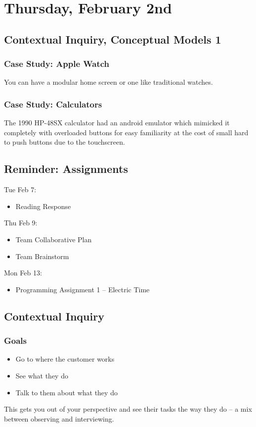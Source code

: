 \section{Thursday, February 2nd}
\subsection{Contextual Inquiry, Conceptual Models 1}
\subsubsection{Case Study: Apple Watch}
You can have a modular home screen or one like traditional watches.

\subsubsection{Case Study: Calculators}
The 1990 HP-48SX calculator had an android emulator which mimicked it completely with overloaded buttons for easy familiarity at the cost of small hard to push buttons due to the touchscreen.

\subsection{Reminder: Assignments}
Tue Feb 7:
\begin{itemize}
\item Reading Response
\end{itemize}

Thu Feb 9:
\begin{itemize}
\item Team Collaborative Plan
\item Team Brainstorm
\end{itemize}

Mon Feb 13:
\begin{itemize}
\item Programming Assignment 1 – Electric Time
\end{itemize}

\subsection{Contextual Inquiry}
\subsubsection{Goals}
\begin{itemize}
    \item Go to where the customer works
    \item See what they do
    \item Talk to them about what they do
\end{itemize}
This gets you out of your perspective and see their tasks the way they do -- a mix between observing and interviewing.

